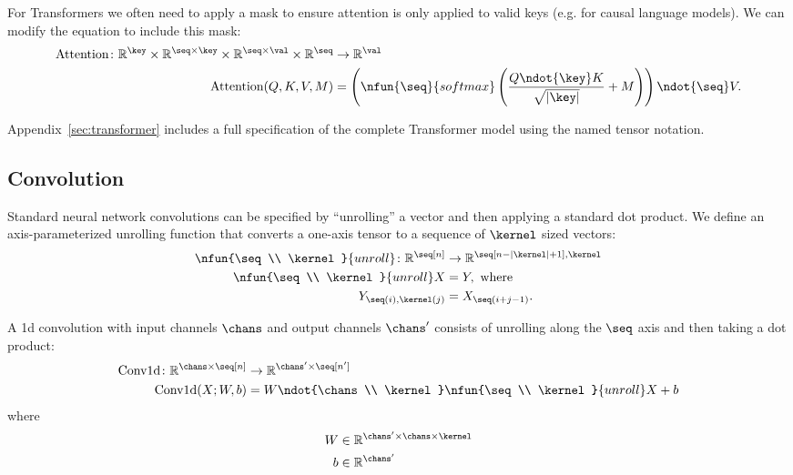 For Transformers we often need to apply a mask to ensure attention is only applied to 
valid keys (e.g. for causal language models). We can modify the equation to include this mask:
\begin{align*}
  \text{Attention} \colon \mathbb{R}^{\key} \times \mathbb{R}^{\seq \times\key} \times \mathbb{R}^{\seq \times\val} \times \mathbb{R}^{\seq} &\rightarrow \mathbb{R}^{\val} \\
\text{Attention}(Q, K, V, M) &= \left( \nfun{\seq}{softmax} \left( \frac{Q \ndot{\key} K}{\sqrt{|\key|}} + M \right) \right) \ndot{\seq} V.
\end{align*}

Appendix~\ref{sec:transformer} includes a full specification of the complete Transformer model using the named tensor notation. 

\subsection{Convolution}

Standard neural network convolutions can be specified by ``unrolling'' a vector and then applying a standard dot product. We define an axis-parameterized unrolling function that converts a one-axis tensor to a sequence of $\kernel$ sized vectors:
\begin{align*}
  \nfun{\seq \\ \kernel}{unroll} \colon \reals^{\seq[n]} &\rightarrow \reals^{\seq[n-|\kernel|+1], \kernel} \\
  \nfun{\seq \\ \kernel}{unroll} X &= Y,\ \text{where} \\
  Y_{\seq(i), \kernel(j)} &= X_{\seq(i+j - 1)}.
\end{align*}

A 1d convolution with input channels $\chans$ and output channels $\chans'$ consists of unrolling along the $\seq$ axis and then taking a dot product: 
\begin{align*}
\text{Conv1d} \colon \reals^{\chans \times \seq[n]} &\rightarrow \mathbb{R}^{\chans' \times \seq[n']} \\
\text{Conv1d}(X; W, b) &= W \ndot{\chans \\ \kernel} \nfun{\seq \\ \kernel}{unroll} X + b
\end{align*}
where
\begin{align*}
W &\in \reals^{\chans' \times \chans \times \kernel} \\
b &\in \reals^{\chans'} \\
\end{align*}

